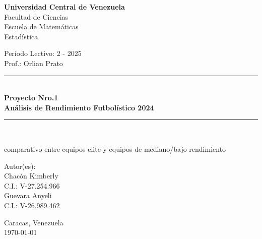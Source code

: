 \documentclass[12pt,a4paper]{article}
\begin{document}
	
	\begin{titlepage}
		\centering
		
		\vspace*{1cm}
		
		{\Large\textbf{Universidad Central de Venezuela}}\\[0.3cm]
		{\large Facultad de Ciencias}\\[0.2cm]
		{\large Escuela de Matemáticas}\\[0.2cm]
		{\large Estadística}\\[0.5cm]
		
		\vspace{1cm}
		
		{\large Período Lectivo: 2 - 2025}\\[0.3cm]
		{\large Prof.: Orlian Prato}\\[2cm]
		
		\rule{\linewidth}{0.5mm}\\[0.4cm]
		{\huge\bfseries Proyecto Nro.1}\\[0.2cm]
		{\Large\bfseries Análisis de Rendimiento Futbolístico 2024}\\[0.4cm]
		\rule{\linewidth}{0.5mm}\\[0.2cm]
		\begin{small}
		{comparativo entre equipos elite y equipos de mediano/bajo rendimiento}\\[2cm]
		\end{small}
		\vfill
		
		{\large Autor(es):}\\[0.3cm]
		{\large Chacón Kimberly}\\
		{\large C.I.: V-27.254.966}\\[0.1cm]
		{\large Guevara Anyeli}\\
		{\large C.I.: V-26.989.462}\\[2cm]
		\vfill
		
		{\large Caracas, Venezuela}\\
		{\large \today}
		
	\end{titlepage}
	
	\newpage
	
\end{document}
